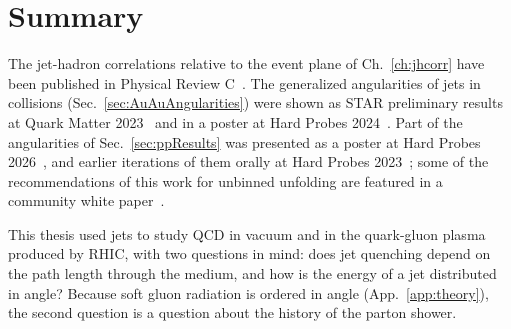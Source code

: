 \chapter{Summary}
\label{ch:summary}
The jet-hadron correlations relative to the event plane of Ch.~\ref{ch:jhcorr} have been published in Physical Review C~\cite{STAR:2023hye}.
%
The generalized angularities of jets in \AuAu collisions (Sec.~\ref{sec:AuAuAngularities}) were shown as STAR preliminary results at Quark Matter 2023~\cite{Pani:2024mgy} and in a poster at Hard Probes 2024~\cite{Pani:HP2024poster}.
%
Part of the \pp angularities of Sec.~\ref{sec:ppResults} was presented as a poster at Hard Probes 2026~\cite{Pani:HP2026poster}, and earlier iterations of them orally at Hard Probes 2023~\cite{Pani_2024}; some of the recommendations of this work for unbinned unfolding are featured in a community white paper~\cite{Canelli_2026}.

This thesis used jets to study QCD in vacuum and in the quark-gluon plasma produced by RHIC, with two questions in mind: does jet quenching depend on the path length through the medium, and how is the energy of a jet distributed in angle?
%
Because soft gluon radiation is ordered in angle (App.~\ref{app:theory}), the second question is a question about the history of the parton shower.

